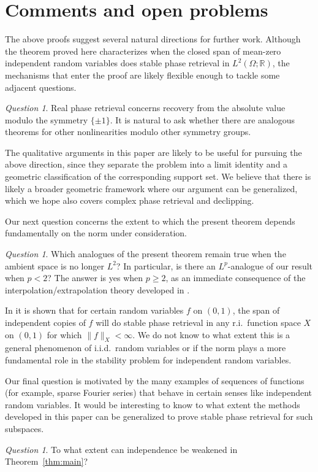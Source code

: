 \documentclass[11pt]{amsart}
\numberwithin{equation}{section}
\theoremstyle{definition}
\theoremstyle{remark}
\newtheorem{question}[theorem]{Question}
\newcommand{\norm}[1]{\lVert #1 \rVert}
\begin{document}
\section{Comments and open problems}\label{sec:comments}

The above proofs suggest several natural directions for
further work.  Although the theorem proved here characterizes when the closed span of mean-zero independent random variables does stable phase retrieval in $L^2(\Omega;\mathbb{R})$, the mechanisms that enter
the proof are likely flexible enough to tackle some adjacent
questions. 
\begin{question}
Real phase retrieval concerns recovery from the absolute value modulo the symmetry $\{\pm1\}$.  It is
natural to ask whether there are analogous theorems for other nonlinearities modulo other symmetry groups.  %
\end{question}
The qualitative arguments in this paper are likely to be useful for pursuing the above direction, since they separate the
problem into a limit identity and a geometric classification of the
corresponding support set.  We believe that there is likely a broader geometric framework where our argument can be generalized,
which we hope also covers complex phase retrieval and declipping.

Our next question concerns the extent to which the present theorem depends fundamentally on the norm under consideration.

\begin{question}
Which analogues of the present theorem remain true when
the ambient space is no longer $L^2$? In particular, is there an $L^p$-analogue of our result when $p<2$? The answer is yes when $p\geq 2$,
as an immediate consequence of the interpolation/extrapolation theory developed in \cite{FOTP}.
\end{question}
In \cite[Section 4]{FOTP} it is shown that for certain random variables $f$ on $(0,1)$, the span of independent 
copies of $f$ will do stable phase retrieval in any r.i.~function space $X$ on $(0,1)$ for which $\norm{f}_X<\infty.$
We do not know to what extent this is a general phenomenon of i.i.d.~random variables or if the norm plays a more fundamental role in the
stability problem for independent random variables.

Our final question is motivated by the many examples of sequences of functions (for example, sparse Fourier series) that behave in certain senses like independent random variables. It would be interesting to know to what extent the methods developed in this paper can be generalized to prove stable phase retrieval for such subspaces.
\begin{question}
To what extent can independence be weakened in Theorem~\ref{thm:main}?
\end{question}
\end{document}
